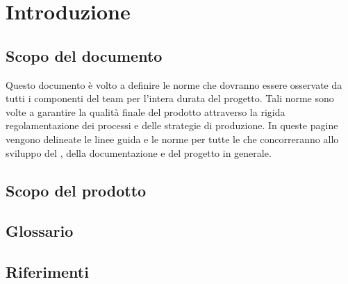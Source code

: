 \newpage
\tableofcontents


\newpage
\section{Introduzione}%
\label{1.0}
\subsection{Scopo del documento}%
\label{1.1}
Questo documento è volto a definire le norme che dovranno essere osservate da tutti i componenti del team per l'intera durata del progetto. Tali norme sono volte a garantire la qualità finale del prodotto attraverso la rigida regolamentazione dei processi e delle strategie di produzione. In queste pagine vengono delineate le linee guida e le norme per tutte le  che concorreranno allo sviluppo del , della documentazione e del progetto in generale.

\subsection{Scopo del prodotto}
\label{1.2}
\Prodotto{}

\subsection{Glossario}%
\label{1.3}
\Glossario{}

\subsection{Riferimenti} %
\label{1.4}
